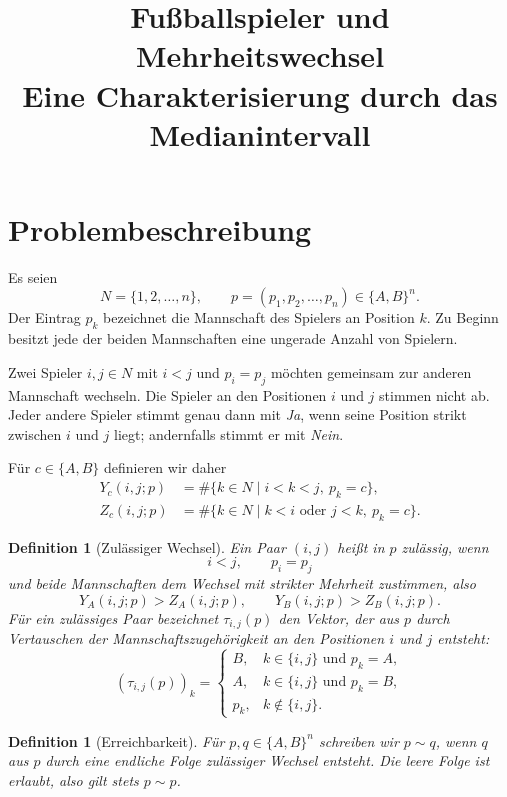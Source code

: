 \documentclass[12pt]{article}
\title{Fußballspieler und Mehrheitswechsel\\
       Eine Charakterisierung durch das Medianintervall}
\author{}
\date{}
\newtheorem{definition}[satz]{Definition}
\begin{document}
\maketitle

\section{Problembeschreibung}

Es seien
\[
N=\{1,2,\ldots,n\},
\qquad
p=(p_1,p_2,\ldots,p_n)\in\{A,B\}^n.
\]
Der Eintrag $p_k$ bezeichnet die Mannschaft des Spielers an Position $k$.
Zu Beginn besitzt jede der beiden Mannschaften eine ungerade Anzahl von
Spielern.

Zwei Spieler $i,j\in N$ mit $i<j$ und $p_i=p_j$ möchten gemeinsam zur
anderen Mannschaft wechseln. Die Spieler an den Positionen $i$ und $j$
stimmen nicht ab. Jeder andere Spieler stimmt genau dann mit \emph{Ja}, wenn
seine Position strikt zwischen $i$ und $j$ liegt; andernfalls stimmt er mit
\emph{Nein}.

Für $c\in\{A,B\}$ definieren wir daher
\begin{align*}
Y_c(i,j;p)
  &=\#\{k\in N\mid i<k<j,\ p_k=c\},\\
Z_c(i,j;p)
  &=\#\{k\in N\mid k<i\text{ oder }j<k,\ p_k=c\}.
\end{align*}

\begin{definition}[Zulässiger Wechsel]
Ein Paar $(i,j)$ heißt in $p$ \emph{zulässig}, wenn
\[
i<j,\qquad p_i=p_j
\]
und beide Mannschaften dem Wechsel mit strikter Mehrheit zustimmen, also
\[
Y_A(i,j;p)>Z_A(i,j;p),
\qquad
Y_B(i,j;p)>Z_B(i,j;p).
\]
Für ein zulässiges Paar bezeichnet $\tau_{i,j}(p)$ den Vektor, der aus $p$
durch Vertauschen der Mannschaftszugehörigkeit an den Positionen $i$ und $j$
entsteht:
\[
(\tau_{i,j}(p))_k=
\begin{cases}
B,&k\in\{i,j\}\text{ und }p_k=A,\\
A,&k\in\{i,j\}\text{ und }p_k=B,\\
p_k,&k\notin\{i,j\}.
\end{cases}
\]
\end{definition}

\begin{definition}[Erreichbarkeit]
Für $p,q\in\{A,B\}^n$ schreiben wir $p\sim q$, wenn $q$ aus $p$ durch eine
endliche Folge zulässiger Wechsel entsteht. Die leere Folge ist erlaubt, also
gilt stets $p\sim p$.
\end{definition}
\end{document}
